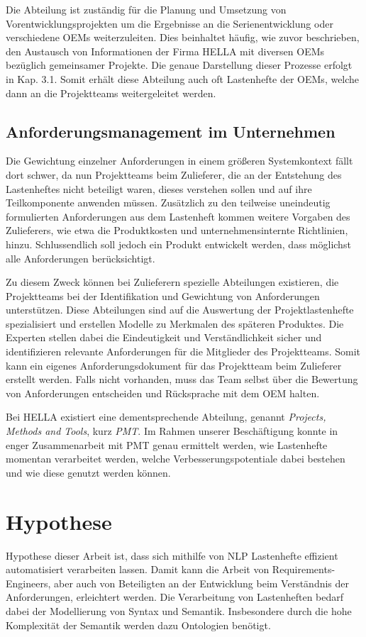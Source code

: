 \documentclass[12pt]{report}
\begin{document}
Die Abteilung ist zuständig für die Planung und Umsetzung von Vorentwicklungsprojekten um die Ergebnisse an die Serienentwicklung oder verschiedene OEMs weiterzuleiten. Dies beinhaltet häufig, wie zuvor beschrieben, den Austausch von Informationen der Firma HELLA mit diversen OEMs bezüglich gemeinsamer Projekte. Die genaue Darstellung dieser Prozesse erfolgt in Kap. 3.1. Somit erhält diese Abteilung auch oft Lastenhefte der OEMs, welche dann an die Projektteams weitergeleitet werden. 

\subsection{Anforderungsmanagement im Unternehmen}
Die Gewichtung einzelner Anforderungen in einem größeren Systemkontext fällt dort schwer, da nun Projektteams beim Zulieferer, die an der Entstehung des Lastenheftes nicht beteiligt waren, dieses verstehen sollen und auf ihre Teilkomponente anwenden müssen. Zusätzlich zu den teilweise uneindeutig formulierten Anforderungen aus dem Lastenheft kommen weitere Vorgaben des Zulieferers, wie etwa die Produktkosten und unternehmensinternte Richtlinien, hinzu. Schlussendlich soll jedoch ein Produkt entwickelt werden, dass möglichst alle Anforderungen berücksichtigt. \cite{mw02}

Zu diesem Zweck können bei Zulieferern spezielle Abteilungen existieren, die Projektteams bei der Identifikation und Gewichtung von Anforderungen unterstützen. Diese Abteilungen sind auf die Auswertung der Projektlastenhefte spezialisiert und erstellen Modelle zu Merkmalen des späteren Produktes. Die Experten stellen dabei die Eindeutigkeit und Verständlichkeit sicher und identifizieren relevante Anforderungen für die Mitglieder des Projektteams. Somit kann ein eigenes Anforderungsdokument für das Projektteam beim Zulieferer erstellt werden. 
Falls nicht vorhanden, muss das Team selbst über die Bewertung von Anforderungen entscheiden und Rücksprache mit dem OEM halten.

Bei HELLA existiert eine dementsprechende Abteilung, genannt \textit{Projects, Methods and Tools}, kurz \textit{PMT}. Im Rahmen unserer Beschäftigung konnte in enger Zusammenarbeit mit PMT genau ermittelt werden, wie Lastenhefte momentan verarbeitet werden, welche Verbesserungspotentiale dabei bestehen und wie diese genutzt werden können.

\section{Hypothese}
Hypothese dieser Arbeit ist, dass sich mithilfe von NLP Lastenhefte effizient automatisiert verarbeiten lassen. Damit kann die Arbeit von Requirements-Engineers, aber auch von Beteiligten an der Entwicklung beim Verständnis der Anforderungen, erleichtert werden. Die Verarbeitung von Lastenheften bedarf dabei der Modellierung von Syntax und Semantik. Insbesondere durch die hohe Komplexität der Semantik werden dazu Ontologien benötigt. 
\end{document}
